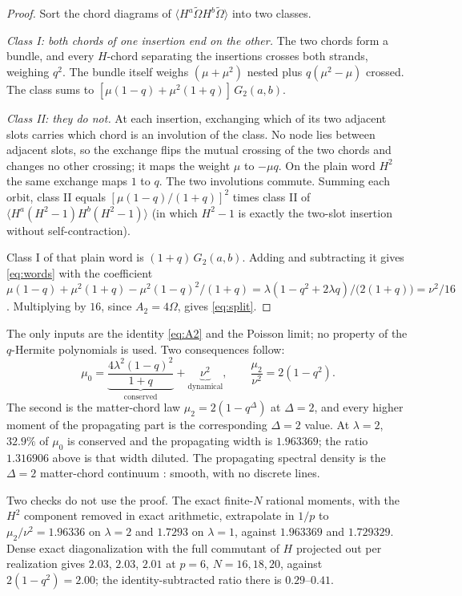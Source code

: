 \documentclass[11pt]{article}
\begin{document}
\begin{proof}
Sort the chord diagrams of $\langle H^a\tilde\Omega H^b\tilde\Omega\rangle$
into two classes.

\emph{Class I: both chords of one insertion end on the other.} The two
chords form a bundle, and every $H$-chord separating the insertions
crosses both strands, weighing $q^2$. The bundle itself weighs
$(\mu+\mu^2)$ nested plus $q(\mu^2-\mu)$ crossed. The class sums to
$[\mu(1-q)+\mu^2(1+q)]\,G_2(a,b)$.

\emph{Class II: they do not.} At each insertion, exchanging which of its
two adjacent slots carries which chord is an involution of the class.
No node lies between adjacent slots, so the exchange flips the mutual
crossing of the two chords and changes no other crossing; it maps the
weight $\mu$ to $-\mu q$. On the plain word $H^2$ the same exchange maps
$1$ to $q$. The two involutions commute. Summing each orbit, class II
equals $[\mu(1-q)/(1+q)]^2$ times class II of
$\langle H^a(H^2-1)H^b(H^2-1)\rangle$ (in which $H^2-1$ is exactly the
two-slot insertion without self-contraction).

Class I of that plain word is $(1+q)\,G_2(a,b)$. Adding and subtracting
it gives \eqref{eq:words} with the coefficient
$\mu(1-q)+\mu^2(1+q)-\mu^2(1-q)^2/(1+q)
=\lambda(1-q^2+2\lambda q)/\big(2(1+q)\big)=\nu^2/16$. Multiplying by
$16$, since $A_2=4\Omega$, gives \eqref{eq:split}.
\end{proof}

The only inputs are the identity \eqref{eq:A2} and the Poisson limit; no
property of the $q$-Hermite polynomials is used. Two consequences follow:
\begin{equation}
\mu_0=\underbrace{\frac{4\lambda^2(1-q)^2}{1+q}}_{\text{conserved}}
+\underbrace{\nu^2}_{\text{dynamical}},\qquad
\frac{\mu_2}{\nu^2}=2(1-q^2).
\end{equation}
The second is the matter-chord law $\mu_2=2(1-q^\Delta)$ at $\Delta=2$,
and every higher moment of the propagating part is the corresponding
$\Delta=2$ value. At $\lambda=2$, $32.9\%$ of $\mu_0$ is conserved and
the propagating width is $1.963369$; the ratio $1.316906$ above is that
width diluted. The propagating spectral density is the $\Delta=2$
matter-chord continuum \cite{BM}: smooth, with no discrete lines.

Two checks do not use the proof. The exact finite-$N$ rational moments,
with the $H^2$ component removed in exact arithmetic, extrapolate in
$1/p$ to $\mu_2/\nu^2=1.96336$ on $\lambda=2$ and $1.7293$ on
$\lambda=1$, against $1.963369$ and $1.729329$. Dense exact
diagonalization with the full commutant of $H$ projected out per
realization gives $2.03$, $2.03$, $2.01$ at $p=6$, $N=16,18,20$, against
$2(1-q^2)=2.00$; the identity-subtracted ratio there is $0.29$--$0.41$.
\end{document}
